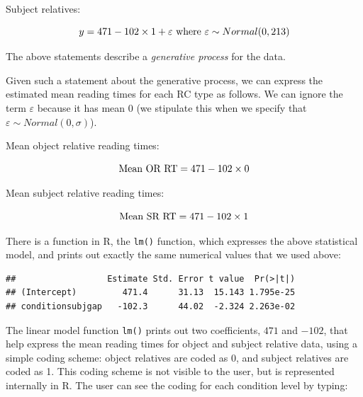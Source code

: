\documentclass[12pt,]{krantz}
\newenvironment{Shaded}{\begin{snugshade}}{\end{snugshade}}
\newcommand{\KeywordTok}[1]{\textcolor[rgb]{0.13,0.29,0.53}{\textbf{#1}}}
\newcommand{\NormalTok}[1]{#1}
\newcommand{\OperatorTok}[1]{\textcolor[rgb]{0.81,0.36,0.00}{\textbf{#1}}}
\begin{document}
Subject relatives:

\begin{equation}
y = 471 - 102\times 1 + \varepsilon \hbox{ where } \varepsilon \sim Normal(0,213)
\end{equation}

The above statements describe a \emph{generative process} for the data.

Given such a statement about the generative process, we can express the estimated mean reading times for each RC type as follows. We can ignore the term \(\varepsilon\) because it has mean 0 (we stipulate this when we specify that \(\varepsilon \sim Normal(0,\sigma)\)).

Mean object relative reading times:

\begin{equation}
\hbox{Mean OR RT}= 471 -102\times 0
\end{equation}

Mean subject relative reading times:

\begin{equation}
\hbox{Mean SR RT} = 471 - 102\times 1 
\end{equation}

There is a function in R, the \texttt{lm()} function, which expresses the above statistical model, and prints out exactly the same numerical values that we used above:

\begin{Shaded}
\end{Shaded}

\begin{verbatim}
##                  Estimate Std. Error t value  Pr(>|t|)
## (Intercept)         471.4      31.13  15.143 1.795e-25
## conditionsubjgap   -102.3      44.02  -2.324 2.263e-02
\end{verbatim}

The linear model function \texttt{lm()} prints out two coefficients, \(471\) and \(-102\), that help express the mean reading times for object and subject relative data, using a simple coding scheme: object relatives are coded as 0, and subject relatives are coded as 1. This coding scheme is not visible to the user, but is represented internally in R. The user can see the coding for each condition level by typing:
\end{document}
